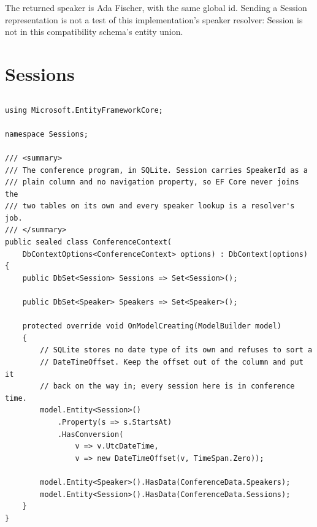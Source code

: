 The returned speaker is Ada Fischer, with the same global id. Sending a
Session representation is not a test of this implementation's speaker
resolver: Session is not in this compatibility schema's entity union.

\section{Sessions}

\subsection*{}
\begin{verbatim}
using Microsoft.EntityFrameworkCore;

namespace Sessions;

/// <summary>
/// The conference program, in SQLite. Session carries SpeakerId as a
/// plain column and no navigation property, so EF Core never joins the
/// two tables on its own and every speaker lookup is a resolver's job.
/// </summary>
public sealed class ConferenceContext(
    DbContextOptions<ConferenceContext> options) : DbContext(options)
{
    public DbSet<Session> Sessions => Set<Session>();

    public DbSet<Speaker> Speakers => Set<Speaker>();

    protected override void OnModelCreating(ModelBuilder model)
    {
        // SQLite stores no date type of its own and refuses to sort a
        // DateTimeOffset. Keep the offset out of the column and put it
        // back on the way in; every session here is in conference time.
        model.Entity<Session>()
            .Property(s => s.StartsAt)
            .HasConversion(
                v => v.UtcDateTime,
                v => new DateTimeOffset(v, TimeSpan.Zero));

        model.Entity<Speaker>().HasData(ConferenceData.Speakers);
        model.Entity<Session>().HasData(ConferenceData.Sessions);
    }
}
\end{verbatim}

